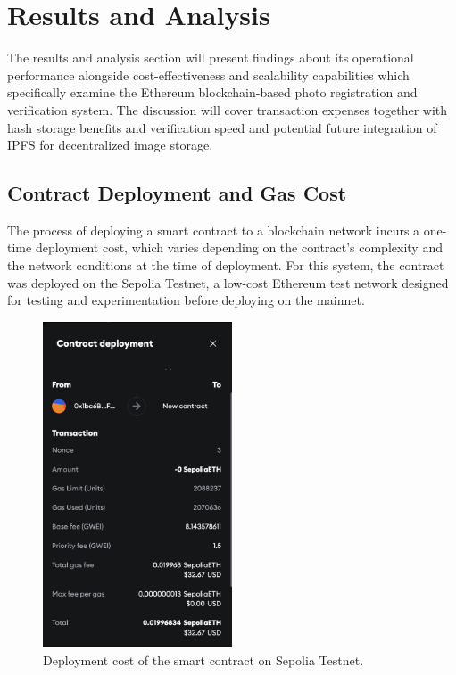 \chapter{Results and Analysis}

The results and analysis section will present findings about its operational performance alongside cost-effectiveness and scalability capabilities which specifically examine the Ethereum blockchain-based photo registration and verification system. 
The discussion will cover transaction expenses together with hash storage benefits and verification speed and potential future integration of IPFS for decentralized image storage.

\section{Contract Deployment and Gas Cost}
The process of deploying a smart contract to a blockchain network incurs a one-time deployment cost, 
which varies depending on the contract's complexity and the network conditions at the time of deployment. For this system, the contract was deployed on the Sepolia Testnet, a low-cost Ethereum test network designed for testing and experimentation before deploying on the mainnet.

\begin{figure}
    \centering
    \includegraphics[width=0.5\textwidth]{images/contractDeploymentCost.png}
    \caption{Deployment cost of the smart contract on Sepolia Testnet.}
    \label{fig:deploymentCost}
\end{figure}

